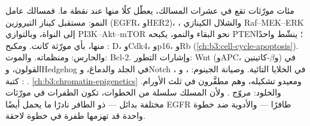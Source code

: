 \begin{proposition}\label{prop:b3:cancer-biology:pathways}
مئات مورّثات  تقع في عشرات المسالك، يعطّل 
كلًا منها عند نقطة ما. فمسالك عامل النمو: مستقبل
كيناز التيروزين (EGFR، وHER2)، ، والشلال الكينازي Raf--MEK--ERK إلى
النواة، وبالتوازي PI3K--Akt--mTOR نحو البقاء والنمو،
يكبحه PTEN؛  ينشّط واحدًا منها، بأي مورّثة كانت.
ومكبح :  D، وCdk4، وp16، وRb (\cref{ch:b3:cell-cycle-apoptosis}).
والحارس:  ومنظماته. والموت: Bcl-2. وإشارات
التطور: Wnt (وAPC، و$\beta$-كاتينين) في القولون، وHedgehog في الجلد
والدماغ، وNotch في الخلايا التائية. وصيانة الجينوم: ، و
، . : كتبة \cref{ch:b3:chromatin-epigenetics}
ومعيدو تشكيله، وهم مطفَّرون في ثلث الأورام.
والخلود: مروّج . ولأن المسلك سلسلة من
الخطوات، تكون الطفرات في مورّثات مختلفة بدائل ---  ذو
 الطافر نادرًا ما يحمل أيضًا EGFR طافرًا --- والأدوية ضد خطوة واحدة
قد تهزمها طفرة في خطوة لاحقة.
\end{proposition}

